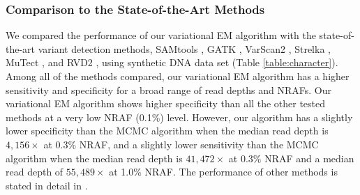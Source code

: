 \documentclass{bmcart}
\begin{document}
\subsubsection*{Comparison to the State-of-the-Art Methods}
We compared the performance of our variational EM algorithm with the state-of-the-art variant detection methods, SAMtools \cite{li2009sequence}, GATK \cite{mckenna2010genome}, VarScan2 \cite{koboldt2012varscan}, Strelka \cite{saunders2012strelka}, MuTect \cite{cibulskis2013sensitive}, and RVD2 \cite{he2015rvd2}, using synthetic DNA data set (Table \ref{table:character}).
Among all of the methods compared, our variational EM algorithm has a higher sensitivity and specificity for a broad range of read depths and NRAFs.
Our variational EM algorithm shows higher specificity than all the other tested methods at a very low NRAF (0.1\%) level.
However, our algorithm has a slightly lower specificity than the MCMC algorithm when the median read depth is $4,156\times$ at 0.3\% NRAF, and a slightly lower sensitivity than the MCMC algorithm when the median read depth is $41,472\times$ at 0.3\% NRAF and a median read depth of $55,489\times$ at 1.0\% NRAF.
The performance of other methods is stated in detail in \cite{he2015rvd2}.
\end{document}
